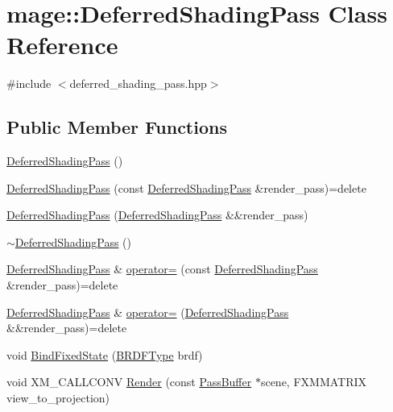 \hypertarget{classmage_1_1_deferred_shading_pass}{}\section{mage\+:\+:Deferred\+Shading\+Pass Class Reference}
\label{classmage_1_1_deferred_shading_pass}


{\ttfamily \#include $<$deferred\+\_\+shading\+\_\+pass.\+hpp$>$}

\subsection*{Public Member Functions}
\begin{DoxyCompactItemize}
\item 
\hyperlink{classmage_1_1_deferred_shading_pass_a348c86ce12342110299739d8d63c6aaf}{Deferred\+Shading\+Pass} ()
\item 
\hyperlink{classmage_1_1_deferred_shading_pass_a4820a800b8ffc4cf0a7d155b09b71210}{Deferred\+Shading\+Pass} (const \hyperlink{classmage_1_1_deferred_shading_pass}{Deferred\+Shading\+Pass} \&render\+\_\+pass)=delete
\item 
\hyperlink{classmage_1_1_deferred_shading_pass_a1aff32dc53f6e377728898ba362d0116}{Deferred\+Shading\+Pass} (\hyperlink{classmage_1_1_deferred_shading_pass}{Deferred\+Shading\+Pass} \&\&render\+\_\+pass)
\item 
\hyperlink{classmage_1_1_deferred_shading_pass_a0feba3a73c56e1c07abe19fddd890f76}{$\sim$\+Deferred\+Shading\+Pass} ()
\item 
\hyperlink{classmage_1_1_deferred_shading_pass}{Deferred\+Shading\+Pass} \& \hyperlink{classmage_1_1_deferred_shading_pass_afcb5b0299030a2a60dcb3685ca875e3e}{operator=} (const \hyperlink{classmage_1_1_deferred_shading_pass}{Deferred\+Shading\+Pass} \&render\+\_\+pass)=delete
\item 
\hyperlink{classmage_1_1_deferred_shading_pass}{Deferred\+Shading\+Pass} \& \hyperlink{classmage_1_1_deferred_shading_pass_a1a3ee174f93d538bd1c8c6a37f1e94f7}{operator=} (\hyperlink{classmage_1_1_deferred_shading_pass}{Deferred\+Shading\+Pass} \&\&render\+\_\+pass)=delete
\item 
void \hyperlink{classmage_1_1_deferred_shading_pass_aa6e4edd14aeaf5388b1f57388dd3aa3e}{Bind\+Fixed\+State} (\hyperlink{namespacemage_ae7a7a03a7b34d7e2689689bb8295cd38}{B\+R\+D\+F\+Type} brdf)
\item 
void X\+M\+\_\+\+C\+A\+L\+L\+C\+O\+NV \hyperlink{classmage_1_1_deferred_shading_pass_ad7973151bdb0a88af7a724534d515f0f}{Render} (const \hyperlink{structmage_1_1_pass_buffer}{Pass\+Buffer} $\ast$scene, F\+X\+M\+M\+A\+T\+R\+IX view\+\_\+to\+\_\+projection)
\end{DoxyCompactItemize}
